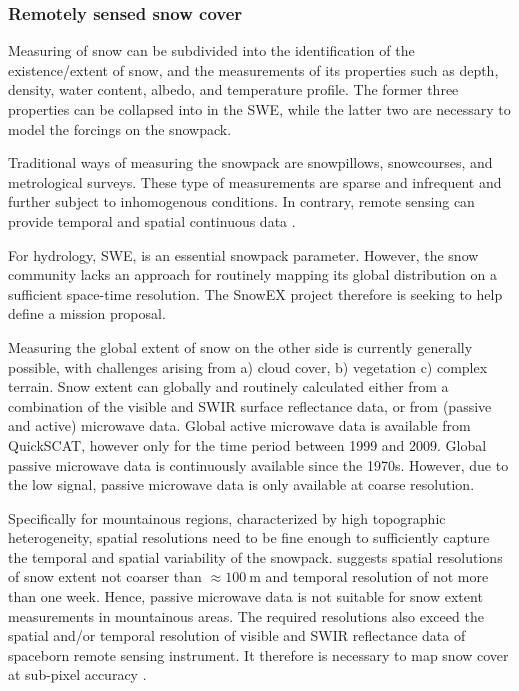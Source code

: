 \documentclass[letterpaper, parskip=half]{scrartcl}
\begin{document}
\subsubsection{Remotely sensed snow cover}
Measuring of snow can be subdivided into the identification of the existence/extent of snow, and the measurements of its properties such as depth, density, water content, albedo, and temperature profile. The former three properties can be collapsed into in the \gls{SWE}, while the latter two are necessary to model the forcings on the snowpack.

Traditional ways of measuring the snowpack are snowpillows, snowcourses, and metrological surveys. These type of measurements are sparse and infrequent and further subject to inhomogenous conditions. In contrary, remote sensing can provide temporal and spatial continuous data \citep{Dozier2004, Nolin2010}.

For hydrology, \gls{SWE}, is an essential snowpack parameter. However, the snow community lacks an approach for routinely mapping its global distribution \citep{Lettenmaier2015} on a sufficient space-time resolution. The SnowEX \citep{Durand2017} project therefore is seeking to help define a mission proposal. 

Measuring the global extent of snow on the other side is currently generally possible, with challenges arising from a) cloud cover, b) vegetation c) complex terrain. Snow extent can globally and routinely calculated either from a combination of the visible and \gls{SWIR} surface reflectance data, or from (passive and active) microwave \citep{Frei2012} data. Global active microwave data is available from \gls{QuickSCAT}, however only for the time period between 1999 and 2009. Global passive microwave data is continuously available since the 1970s. However, due to the low signal, passive microwave data is only available at coarse resolution.

Specifically for mountainous regions, characterized by high topographic heterogeneity, spatial resolutions need to be fine enough to sufficiently capture the temporal and spatial variability of the snowpack. \cite{Lettenmaier2015} suggests spatial resolutions of snow extent not coarser than $\approx \SI{100}{\meter}$ and temporal resolution of not more than one week. Hence, passive microwave data is not suitable for snow extent measurements in mountainous areas. The required resolutions also exceed the spatial and/or temporal resolution of visible and \gls{SWIR} reflectance data of spaceborn remote sensing instrument. It therefore is necessary to map snow cover at sub-pixel accuracy \citep{Dozier2004}.
\end{document}
